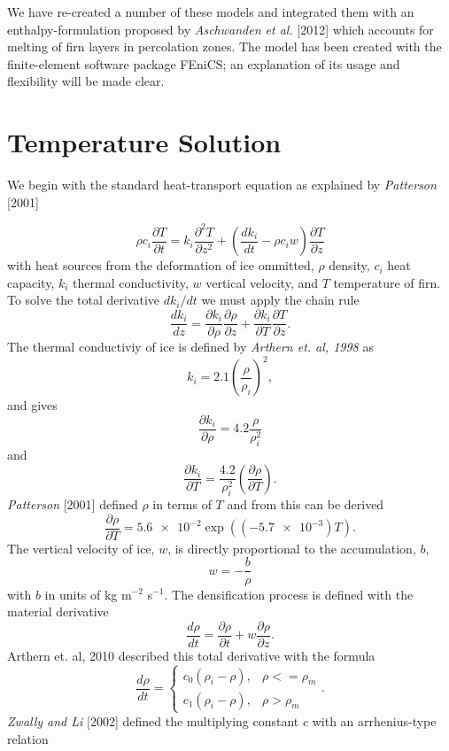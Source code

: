 \documentclass{article}%
\begin{document}
We have re-created a number of these models and integrated them with an enthalpy-formulation proposed by \emph{Aschwanden et al.} [2012] which accounts for melting of firn layers in percolation zones.  The model has been created with the finite-element software package FEniCS; an explanation of its usage and flexibility will be made clear.

\section{Temperature Solution}

We begin with the standard heat-transport equation as explained by \emph{Patterson} [2001]

  $$
  \rho c_i \frac{\partial T}{\partial t} = 
    k_i \frac{\partial^2 T}{\partial z^2} +
    \left( \frac{dk_i}{dt} - \rho c_i w \right) \frac{\partial T}{\partial z}
  $$
with heat sources from the deformation of ice ommitted, $\rho$ density, $c_i$ heat capacity, $k_i$ thermal conductivity, $w$ vertical velocity, and $T$ temperature of firn.  To solve the total derivative $dk_i/dt$ we must apply the chain rule
  $$
  \frac{dk_i}{dz} = 
  \frac{\partial k_i}{\partial \rho} \frac{\partial \rho}{\partial z} + 
  \frac{\partial k_i}{\partial T} \frac{\partial T}{\partial z}.
  $$
The thermal conductiviy of ice is defined by \emph{Arthern et. al, 1998} as
  $$k_i = 2.1 \left(\frac{\rho}{\rho_i}\right)^2,$$
and gives
  $$
  \frac{\partial k_i}{\partial \rho} = 
    4.2 \frac{\rho}{\rho_i^2}
  $$
and
  $$
  \frac{\partial k_i}{\partial T} = 
    \frac{4.2}{\rho_i^2} \left( \frac{\partial \rho}{\partial T} \right).
  $$
\emph{Patterson} [2001] defined $\rho$ in terms of $T$ and from this can be derived
  $$
  \frac{\partial \rho}{\partial T} = 
    \SI{5.6e-2} \exp ((\SI{-5.7e-3})T).
  $$
The vertical velocity of ice, $w$, is directly proportional to the accumulation, $b$,
  $$
  w = -\frac{b}{\rho}
  $$
with $b$ in units of kg m$^{-2}$ s$^{-1}$.  The densification process is defined with the material derivative
  $$\frac{d \rho}{dt} = \frac{\partial \rho}{\partial t} + 
    w\frac{\partial \rho}{\partial z}.$$
Arthern et. al, 2010 described this total derivative with the formula  
  $$
  \frac{d \rho}{dt} = 
  \begin{cases}
   c_0(\rho_i - \rho), &\rho <= \rho_m\\
   c_1(\rho_i - \rho), &\rho > \rho_m
  \end{cases}.$$
\emph{Zwally and Li} [2002] defined the multiplying constant $c$ with an arrhenius-type relation
\end{document}
